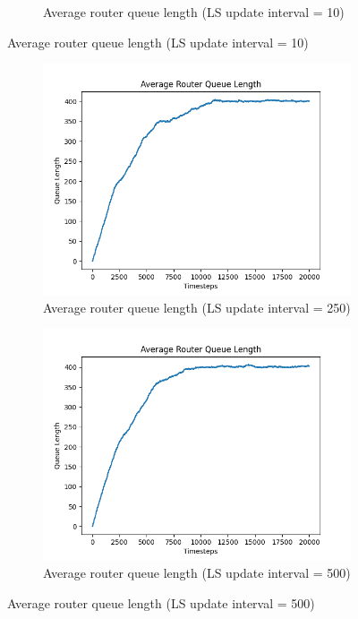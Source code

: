 \begin{figure}[h]
\begin{subfigure}[b]{0.475\textwidth}
            \caption[]{Average router queue length (LS update interval = 10)}
        \end{subfigure}
    \end{figure}
    \begin{figure}[H]\ContinuedFloat
        \centering
        \begin{subfigure}[b]{0.475\textwidth}
            \centering
            \includegraphics[width=\textwidth]{figs/appendix/average_ls=50.png}
            \caption[]{Average router queue length (LS update interval = 250)}
        \end{subfigure}
        \hfill
        \begin{subfigure}[b]{0.475\textwidth}
            \centering
            \includegraphics[width=\textwidth]{figs/appendix/average_ls=500.png}
            \caption[]{Average router queue length (LS update interval = 500)}
        \end{subfigure}
    \end{figure}

